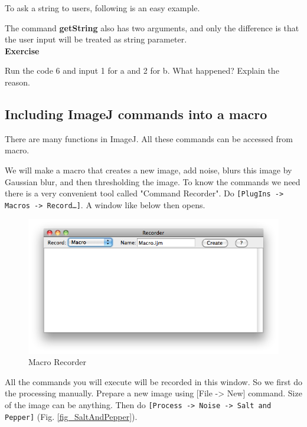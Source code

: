 \documentclass[11pt,a4paper,oneside]{report}
\newenvironment{indentexercise}[1]%
{{\setlength{\leftmargin}{2em}}%
\textbf{Exercise \thesubsection-#1}%
\begin{list}{}%
	\item%
}
{\end{list}}
\newcommand{\ijmenu}[1]{\texttt{\small#1}}
\begin{document}
To ask a string to users, following is an easy example. 


The command \textbf{getString} also has two arguments, and only the difference is that the user input will be treated as string parameter. \\

\begin{indentexercise}{1}
Run the code 6 and input 1 for a and 2 for b. What happened? Explain the reason. 
\end{indentexercise}

\subsection{Including ImageJ commands into a macro}
There are many functions in ImageJ. All these commands can be accessed from macro. 

We will make a macro that creates a new image, add noise,  blurs this image by Gaussian blur, and then thresholding the image. To know the commands we need there is a very convenient tool called "Command Recorder". Do \ijmenu{[PlugIns -> Macros -> Record\ldots]}. A window like below then opens. 

\begin{figure}[htbp]
\begin{center}
\includegraphics[scale=0.6]{fig/MacroRecorderBlank.png}
\caption{Macro Recorder} \label{fig_macroRecorderBlank}
\end{center}
\end{figure}

All the commands you will execute will be recorded in this window. So we first do the processing manually. Prepare a new image using [File -> New] command. Size of the image can be anything. Then do \ijmenu{[Process -> Noise -> Salt and Pepper]} (Fig. \ref{fig_SaltAndPepper}).
\end{document}
